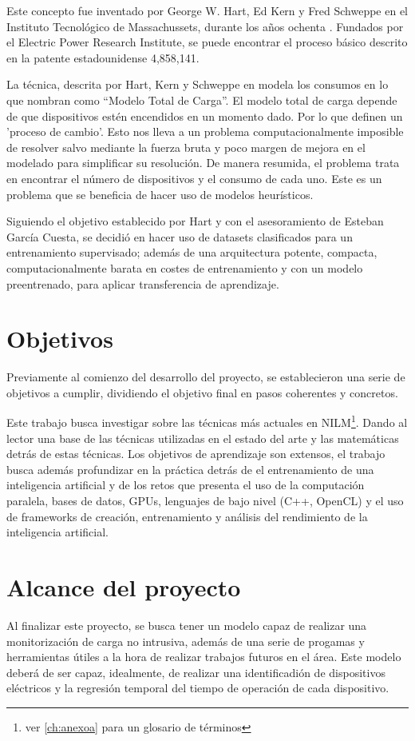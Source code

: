 Este concepto fue inventado por George W. Hart, Ed Kern y Fred Schweppe en el Instituto Tecnológico de Massachussets, durante los años ochenta \autocite{192069}. Fundados por el Electric Power Research Institute, se puede encontrar el proceso básico descrito en la patente estadounidense 4,858,141.

La técnica, descrita por Hart, Kern y Schweppe en \autocite{192069} modela los consumos en lo que nombran como \enquote{Modelo Total de Carga}. El modelo total de carga depende de que dispositivos estén encendidos en un momento dado. Por lo que definen un 'proceso de cambio'.
Esto nos lleva a un problema computacionalmente imposible de resolver salvo mediante la fuerza bruta\autocite[4]{192069} y poco margen de mejora en el modelado para simplificar su resolución. De manera resumida, el problema trata en encontrar el número de dispositivos y el consumo de cada uno. 
Este es un problema que se beneficia de hacer uso de modelos heurísticos.

Siguiendo el objetivo establecido por Hart y con el asesoramiento de Esteban García Cuesta, se decidió en hacer uso de datasets clasificados para un entrenamiento supervisado; además de una arquitectura potente, compacta, computacionalmente barata en costes de entrenamiento y con un modelo preentrenado, para aplicar transferencia de aprendizaje. 

\section{Objetivos}
\label{sec:objetivos}
Previamente al comienzo del desarrollo del proyecto, se establecieron una serie de objetivos a cumplir, dividiendo el objetivo final en pasos coherentes y concretos.

Este trabajo busca investigar sobre las técnicas más actuales en NILM\footnote{ver \autoref{ch:anexoa} para un glosario de términos}. Dando al lector una base de las técnicas utilizadas en el estado del arte y las matemáticas detrás de estas técnicas.
Los objetivos de aprendizaje son extensos, el trabajo busca además profundizar en la práctica detrás de el entrenamiento de una inteligencia artificial y de los retos que presenta el uso de la computación paralela, bases de datos, GPUs, lenguajes de bajo nivel (C++, OpenCL) y el uso de frameworks de creación, entrenamiento y análisis del rendimiento de la inteligencia artificial.


\section{Alcance del proyecto}
\label{sec:alcanceproyecto}
Al finalizar este proyecto, se busca tener un modelo capaz de realizar una monitorización de carga no intrusiva, además de una serie de progamas y herramientas útiles a la hora de realizar trabajos futuros en el área.
Este modelo deberá de ser capaz, idealmente, de realizar una identificadión de dispositivos eléctricos y la regresión temporal del tiempo de operación de cada dispositivo.

